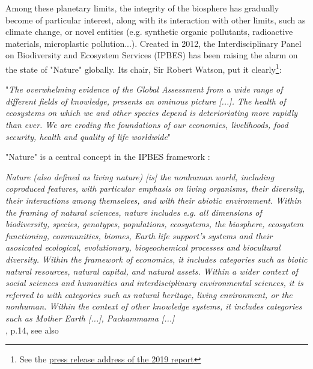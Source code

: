 Among these planetary limits, the integrity of the biosphere has gradually become of particular interest, along with its interaction with other limits, such as climate change, or novel entities (e.g. synthetic organic pollutants, radioactive materials, microplastic pollution...). Created in 2012, the Interdisciplinary Panel on Biodiversity and Ecosystem Services (IPBES) has been raising the alarm on the state of "Nature" globally. Its chair, Sir Robert Watson, put it clearly\footnote{See the \href{https://www.ipbes.net/news/Media-Release-Global-Assessment}{press release address of the 2019 report}}:
\begin{displayquote}
"\textit{The overwhelming evidence of the \cite{ipbes_2022_6417333} Global Assessment from a wide range of different fields of knowledge, presents an ominous picture [...]. The health of ecosystems on which we and other species depend is deterioriating more rapidly than ever. We are eroding the foundations of our economies, livelihoods, food security, health and quality of life worldwide}"
\end{displayquote}

"Nature" is a central concept in the IPBES framework \citep{ipbes_2022_6417333}:

\begin{displayquote}
\textit{Nature (also defined as living nature) [is] the nonhuman world, including coproduced features, with particular emphasis on living organisms, their diversity, their interactions among themselves, and with their abiotic environment. Within the framing of natural sciences, nature includes e.g. all dimensions of biodiversity, species, genotypes, populations, ecosystems, the biosphere, ecosystem functioning, communities, biomes, Earth life support's systems and their asosicated ecological, evolutionary, biogeochemical processes and biocultural diversity. Within the framework of economics, it includes categories such as biotic natural resources, natural capital, and natural assets. Within a wider context of social sciences and humanities and interdisciplinary environmental sciences, it is referred to with categories such as natural heritage, living environment, or the nonhuman. Within the context of other knowledge systems, it includes categories such as Mother Earth [...], Pachammama [...]}\\
\hspace*{\fill} \small{\cite{ipbes_2022_6417333}, p.14, see also \cite{DIAZ20151}}
\end{displayquote}

